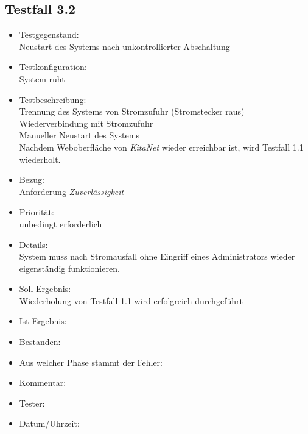 \subsection{Testfall 3.2}
\begin{itemize}
	\item Testgegenstand:\\
Neustart des Systems nach unkontrollierter Abschaltung
	\item Testkonfiguration:\\
	System ruht
	\item Testbeschreibung:\\
	Trennung des Systems von Stromzufuhr (Stromstecker raus)\\
	Wiederverbindung mit Stromzufuhr\\
	Manueller Neustart des Systems\\
	Nachdem Weboberfläche von \textit{KitaNet} wieder erreichbar ist, wird Testfall 1.1 wiederholt.
	\item Bezug:\\
	Anforderung \textit{Zuverlässigkeit}
	\item Priorität:\\
	unbedingt erforderlich
	\item Details:\\
	System muss nach Stromausfall ohne Eingriff eines Administrators wieder eigenständig  funktionieren.
	\item Soll-Ergebnis:\\
	Wiederholung von Testfall 1.1 wird erfolgreich durchgeführt
	\item Ist-Ergebnis:\\
	\item Bestanden:\\
	\item Aus welcher Phase stammt der Fehler:\\
	\item Kommentar:\\
	\item Tester:\\
	\item Datum/Uhrzeit:\\
\end{itemize}
